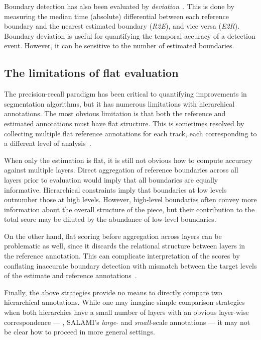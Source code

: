 \documentclass{article}
\begin{document}
Boundary detection has also been evaluated by \emph{deviation}~\cite{turnbull2007supervised}.
This is done by measuring the median time (absolute) differential between each reference boundary and the nearest estimated boundary (\emph{R2E}), and vice versa (\emph{E2R}).
Boundary deviation is useful for quantifying the temporal accuracy of a detection event.
However, it can be sensitive to the number of estimated boundaries.

\subsection{The limitations of flat evaluation}
The precision-recall paradigm has been critical to quantifying improvements in segmentation algorithms, but it has numerous limitations with hierarchical annotations.
The most obvious limitation is that both the reference and estimated annotations must have flat structure.
This is sometimes resolved by collecting multiple flat reference annotations for each track, 
each corresponding to a different level of analysis~\cite{Smith2011}.

When only the estimation is flat, it is still not obvious how to compute accuracy against multiple layers.
Direct aggregation of reference boundaries across all layers prior to evaluation would imply 
that all boundaries are equally informative.
Hierarchical constraints imply that boundaries at low levels outnumber those at high levels.
However, high-level boundaries often convey more information about the overall structure of the piece, but
their contribution to the total score may be diluted by the abundance of low-level boundaries.

On the other hand, flat scoring before aggregation across layers can be problematic as well, 
since it discards the relational structure between layers in the reference annotation.
This can complicate interpretation of the scores by conflating inaccurate boundary detection
with mismatch between the target levels of the estimate and reference annotations~\cite{Smith2013}.

Finally, the above strategies provide no means to directly compare two hierarchical annotations.
While one may imagine simple comparison strategies when both hierarchies have a small
number of layers with an obvious layer-wise correspondence 
--- \eg, SALAMI's \emph{large}- and \emph{small}-scale annotations --- it may not be clear how to proceed in
more general settings.
\end{document}
